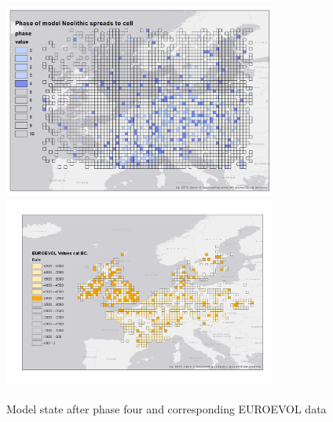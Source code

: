 \begin{figure}
\centering
	\includegraphics[width=0.8\textwidth]{figures/model-4}
	\includegraphics[width=0.8\textwidth]{figures/euroevol-4}
  \caption{Model state after phase four and corresponding EUROEVOL data}
  \label{fig:compare4}
\end{figure}

